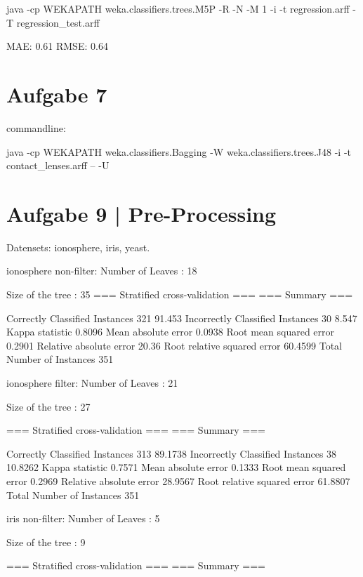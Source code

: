 java -cp WEKAPATH weka.classifiers.trees.M5P -R -N -M 1 -i -t regression.arff -T regression\_test.arff


MAE: 0.61 
RMSE: 0.64 


\section{Aufgabe 7}

commandline: 

java -cp WEKAPATH weka.classifiers.Bagging -W weka.classifiers.trees.J48 -i -t contact\_lenses.arff -- -U



\section{Aufgabe 9 | Pre-Processing}
Datensets: ionosphere, iris, yeast.

ionosphere non-filter:
Number of Leaves  : 	18

Size of the tree : 	35
=== Stratified cross-validation ===
=== Summary ===

Correctly Classified Instances         321               91.453  %
Incorrectly Classified Instances        30                8.547  %
Kappa statistic                          0.8096
Mean absolute error                      0.0938
Root mean squared error                  0.2901
Relative absolute error                 20.36   %
Root relative squared error             60.4599 %
Total Number of Instances              351

ionosphere filter:
Number of Leaves  : 	21

Size of the tree : 	27

=== Stratified cross-validation ===
=== Summary ===

Correctly Classified Instances         313               89.1738 %
Incorrectly Classified Instances        38               10.8262 %
Kappa statistic                          0.7571
Mean absolute error                      0.1333
Root mean squared error                  0.2969
Relative absolute error                 28.9567 %
Root relative squared error             61.8807 %
Total Number of Instances              351     


iris non-filter:
Number of Leaves  : 	5

Size of the tree : 	9

=== Stratified cross-validation ===
=== Summary ===

